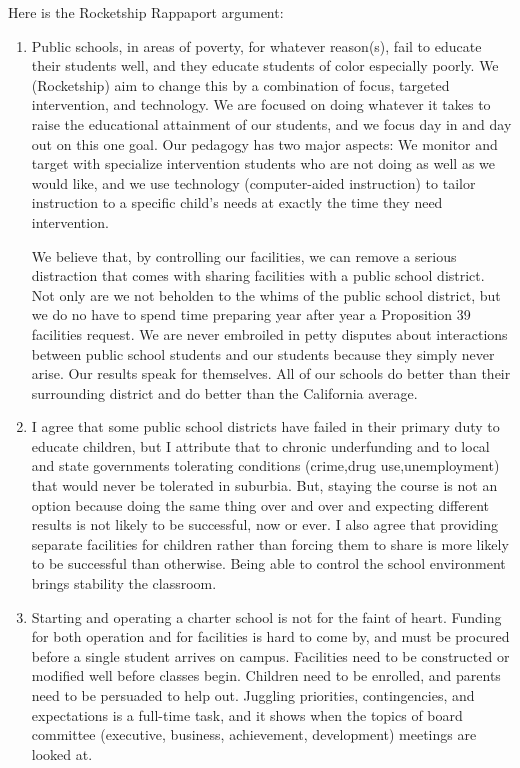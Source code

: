 Here is the Rocketship Rappaport argument:
\begin{enumerate}[topsep=0.3\baselineskip,itemsep=0.25\baselineskip]
  \item Public schools, in areas of poverty, for whatever reason(s), fail to educate their students well, and they educate students of color especially poorly. We (Rocketship) aim to change this by a combination of focus, targeted intervention, and technology. We are focused on doing whatever it takes to raise the educational attainment of our students, and we focus day in and day out on this one goal. Our pedagogy has two major aspects: We monitor and target with specialize intervention students who are not doing as well as we would like, and we use technology (computer-aided instruction) to tailor instruction to a specific child's needs at exactly the time they need intervention.
  
  We believe that, by controlling our facilities, we can remove a serious distraction that comes with sharing facilities with a public school district. Not only are we not beholden to the whims of the public school district, but we do no have to spend time preparing year after year a Proposition 39 facilities request. We are never embroiled in petty disputes about interactions between public school students and our students because they simply never arise. Our results speak for themselves. All of our schools do better than their surrounding district and do better than the California average.

  \item I agree that some public school districts have failed in their primary duty to educate children, but I attribute that to chronic underfunding and to local and state governments tolerating conditions (crime,drug use,unemployment) that would never be tolerated in suburbia. But, staying the course is not an option because doing the same thing over and over and expecting different results is not likely to be successful, now or ever.
  I also agree that providing separate facilities for children rather than forcing them to share is more likely to be successful than otherwise. Being able to control the school environment brings stability the classroom.

  \item Starting and operating a charter school is not for the faint of heart. Funding for both operation and for facilities is hard to come by, and must be procured before a single student arrives on campus. Facilities need to be constructed or modified well before classes begin. Children need to be enrolled, and parents need to be persuaded to help out. Juggling priorities, contingencies, and expectations is a full-time task, and it shows when the topics of board committee (executive, business, achievement, development) meetings are looked at.


\end{enumerate}
